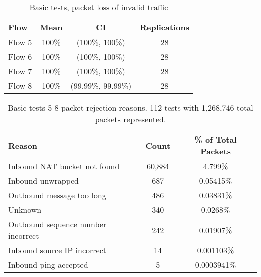 \documentclass{beamer}
\begin{document}
\begin{frame}
\begin{overprint}
		\begin{table}
		\caption{Basic tests, packet loss of invalid traffic}
		\label{tbl:basic_invalid_loss}
		\centering
		\begin{tabular}{lccc}
		\toprule
		\textbf{Flow} & \textbf{Mean} & \textbf{CI} & \textbf{Replications}\\
		\hline
		Flow 5 & 100\% & (100\%, 100\%) & 28\\
		Flow 6 & 100\% & (100\%, 100\%) & 28\\
		Flow 7 & 100\% & (100\%, 100\%) & 28\\
		Flow 8 & 100\% & (99.99\%, 99.99\%) & 28\\
		\bottomrule
		\end{tabular}
		\end{table}

		\footnotesize{		
		\begin{table}
		\caption{Basic tests 5-8 packet rejection reasons. 112 tests with 1,268,746 total packets represented.}
		\label{tbl:basic_loss_reasons_invalid}
		\centering
		\begin{tabular}{lcc}
		\toprule
		\textbf{Reason} & \textbf{Count}  & \textbf{\% of Total Packets}\\
		\hline
		Inbound NAT bucket not found & 60,884 & 4.799\%\\
		Inbound unwrapped & 687 & 0.05415\%\\
		Outbound message too long & 486 & 0.03831\%\\
		Unknown & 340 & 0.0268\%\\
		Outbound sequence number incorrect & 242 & 0.01907\%\\
		Inbound source IP incorrect & 14 & 0.001103\%\\
		Inbound ping accepted & 5 & 0.0003941\%\\
		\bottomrule
		\end{tabular}
		\end{table}
		}
	\end{overprint}
\end{frame}
\end{document}
